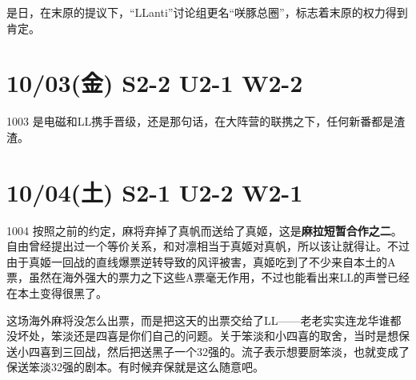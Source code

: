 是日，在末原的提议下，“LLanti”讨论组更名“咲豚总圈”，标志着末原的权力得到肯定。

\section{10/03(金) S2-2 U2-1 W2-2}


1003 是电磁和LL携手晋级，还是那句话，在大阵营的联携之下，任何新番都是渣渣。

\section{10/04(土) S2-1 U2-2 W2-1}


1004 按照之前的约定，麻将弃掉了真帆而送给了真姬，这是\textbf{麻拉短暂合作之二}。自由曾经提出过一个等价关系，和对凛相当于真姬对真帆，所以该让就得让。不过由于真姬一回战的直线爆票逆转导致的风评被害，真姬吃到了不少来自本土的A票，虽然在海外强大的票力之下这些A票毫无作用，不过也能看出来LL的声誉已经在本土变得很黑了。

这场海外麻将没怎么出票，而是把这天的出票交给了LL——老老实实连龙华谁都没坏处，笨淡还是四喜是你们自己的问题。关于笨淡和小四喜的取舍，当时是想保送小四喜到三回战，然后把送黑子一个32强的。流子表示想要厨笨淡，也就变成了保送笨淡32强的剧本。有时候弃保就是这么随意吧。

